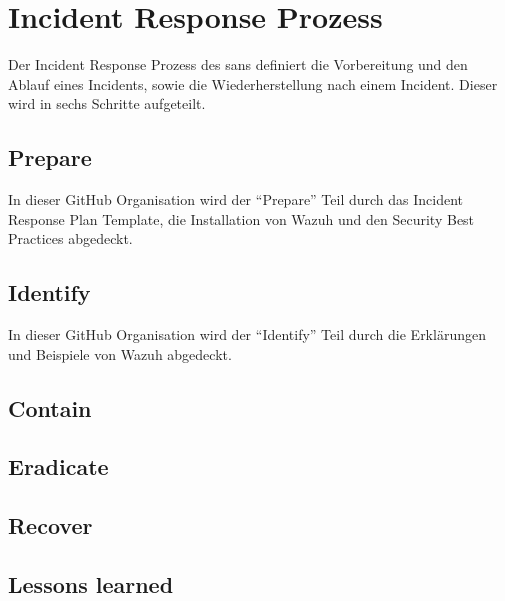 \section{Incident Response Prozess}
Der Incident Response Prozess des \acrfull{sans} definiert die Vorbereitung und den Ablauf eines Incidents, sowie die Wiederherstellung nach einem Incident.
Dieser wird in sechs Schritte aufgeteilt. 

\subsection{Prepare}


In dieser GitHub Organisation wird der ``Prepare'' Teil durch das Incident Response Plan Template, die Installation von Wazuh und den Security Best Practices abgedeckt.

\subsection{Identify}

In dieser GitHub Organisation wird der ``Identify'' Teil durch die Erklärungen und Beispiele von Wazuh abgedeckt.

\subsection{Contain}



\subsection{Eradicate}


\subsection{Recover}


\subsection{Lessons learned}



